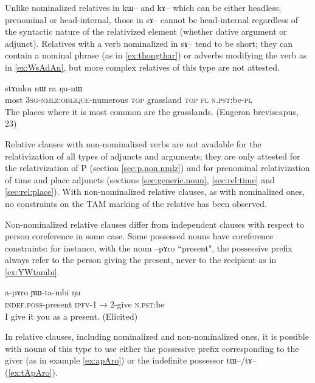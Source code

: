 \documentclass[oldfontcommands,oneside,a4paper,11pt]{article}
\newcommand{\ipa}[1]{{\phon #1}} %
\begin{document}
Unlike nominalized relatives in \ipa{kɯ}-- and \ipa{kɤ}-- which can be either headless, prenominal or head-internal, those in \ipa{sɤ}-- cannot be head-internal regardless of the syntactic nature of the relativized element (whether dative argument or adjunct). Relatives with a verb nominalized in \ipa{sɤ}-- tend to be short; they can contain a nominal phrase (as in  \ref{ex:thongthar}) or adverbs modifying the verb as in \ref{ex:WsAdAn}, but more complex relatives of this type are not attested.
 
\begin{exe}
   \ex \label{ex:WsAdAn}
 \gll  
  [\ipa{stu}   	\ipa{ɯ-sɤ-dɤn}]   	\ipa{nɯ}   	\ipa{stɤmku}   	\ipa{nɯ} \ipa{ra}   	\ipa{ŋu-nɯ}   \\
most \textsc{3sg-nmlz:oblique}-numerous \textsc{top} grassland \textsc{top} \textsc{pl} \textsc{n.pst}:be-\textsc{pl} \\
\glt The places where it is most common are the grasslands. (Eugeron breviscapus, 23)
    \end{exe}
    

	  
	Relative clauses with non-nominalized verbs are not available for the relativization of all types of adjuncts and arguments; they are only attested for the relativization of P (section \ref{sec:p.non.nmlz}) and for prenominal relativization of time and place adjuncts (sections \ref{sec:generic.noun}, \ref{sec:rel:time} and \ref{sec:rel:place}). With non-nominalized relative clauses, as with nominalized ones, no constraints on the TAM marking of the relative has been observed.
	
	
	Non-nominalized relative clauses differ from independent clauses with respect to person coreference in some case. Some possessed nouns have coreference constraints: for instance, with the noun \ipa{--pɤro} ``present", the possessive prefix always refer to the person giving the present, never to the recipient as in \ref{ex:YWtambi}. 
			\begin{exe}
\ex \label{ex:YWtambi}
\gll
	\ipa{a-pɤro}  	\ipa{ɲɯ-ta-mbi}  	\ipa{ŋu}  \\
	\textsc{indef.poss}-present \textsc{ipfv}-1$\rightarrow$2-give \textsc{n.pst}:be \\
	\glt I give it you as a present. (Elicited)
 	  \end{exe} 
	 
	 In relative clauses, including nominalized and non-nominalized ones, it is possible with nouns of this type to use either the possessive prefix corresponding to the giver (as in example \ref{ex:apAro}) or the indefinite possessor \ipa{tɯ}--/\ipa{tɤ}-- (\ref{ex:tApAro}).
	 
\end{document}
